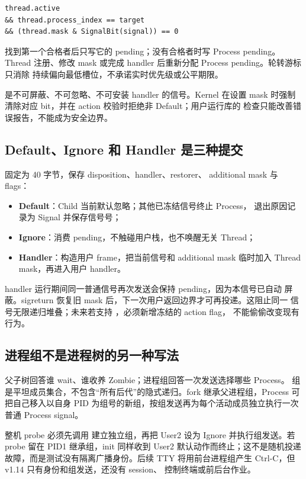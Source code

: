 \begin{lstlisting}
thread.active
&& thread.process_index == target
&& (thread.mask & SignalBit(signal)) == 0
\end{lstlisting}

找到第一个合格者后只写它的 pending；没有合格者时写 Process pending。Thread
注册、修改 mask 或完成 handler 后重新分配 Process pending。轮转游标只消除
持续偏向最低槽位，不承诺实时优先级或公平期限。

 是不可屏蔽、不可忽略、不可安装 handler 的信号。Kernel 在设置
mask 时强制清除对应 bit，并在 action 校验时拒绝非 Default；用户运行库的
检查只能改善错误报告，不能成为安全边界。

\subsection{Default、Ignore 和 Handler 是三种提交}

 固定为 40 字节，保存 disposition、handler、restorer、
additional mask 与 flags：

\begin{itemize}
  \item \textbf{Default}：Child 当前默认忽略；其他已冻结信号终止 Process，
        退出原因记录为 Signal 并保存信号号；
  \item \textbf{Ignore}：消费 pending，不触碰用户栈，也不唤醒无关 Thread；
  \item \textbf{Handler}：构造用户 frame，把当前信号和 additional mask
        临时加入 Thread mask，再进入用户 handler。
\end{itemize}

handler 运行期间同一普通信号再次发送会保持 pending，因为本信号已自动
屏蔽。sigreturn 恢复旧 mask 后，下一次用户返回边界才可再投递。这阻止同一
信号无限递归堆叠；未来若支持 ，必须新增冻结的 action flag，
不能偷偷改变现有行为。

\subsection{进程组不是进程树的另一种写法}

父子树回答谁 wait、谁收养 Zombie；进程组回答一次发送选择哪些 Process。
组是平坦成员集合，不包含“所有后代”的隐式递归。fork 继承父进程组，Process
可把自己移入以自身 PID 为组号的新组，按组发送再为每个活动成员独立执行一次
普通 Process signal。

整机 probe 必须先调用  建立独立组，再把 User2
设为 Ignore 并执行组发送。若 probe 留在 PID1 继承组，init 同样收到 User2
默认动作而终止；这不是随机投递故障，而是测试没有隔离广播身份。后续 TTY
将用前台进程组产生 Ctrl-C，但 v1.14 只有身份和组发送，还没有 session、
控制终端或前后台作业。

